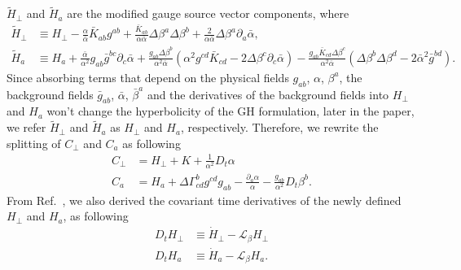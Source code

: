 \documentclass[letterpaper,nofootinbib,prd,amsmath,onecolumn]{revtex4-1}
\begin{document}
${\tilde H}_{\perp}$ and ${\tilde H}_{a}$ are the modified gauge source vector components, where
\begin{subequations}
\begin{align}
{\tilde H}_{\perp} & \equiv H_{\perp} - \frac{\alpha}{{\bar \alpha}}{\bar K}_{ab}g^{ab} + \frac{{\bar K}_{ab}}{\alpha{\bar \alpha}}\Delta \beta^{a} \Delta \beta^{b} + \frac{2}{\alpha {\bar \alpha}}\Delta \beta^{a} \partial_{a}{\bar \alpha}, \\
{\tilde H}_{a} & \equiv H_{a} + \frac{{\bar \alpha}}{\alpha^2}g_{ab}{\bar g}^{bc}\partial_{c}{\bar \alpha} + \frac{g_{ab}\Delta \beta^{b}}{\alpha^2 {\bar \alpha}}(\alpha^2g^{cd}{\bar K}_{cd} - 2\Delta\beta^{c}\partial_{c}{\bar \alpha}) - \frac{g_{ab}{\bar K}_{cd}\Delta \beta^{c}}{\alpha^2{\bar \alpha}}(\Delta \beta^{b}\Delta \beta^{d} - 2{\bar \alpha}^2{\bar g}^{bd}).
\end{align}
\end{subequations}
Since absorbing terms that depend on the physical fields $g_{ab}$, $\alpha$, $\beta^{a}$, the background fields ${\bar g}_{ab}$, ${\bar \alpha}$, ${\bar \beta}^{a}$ and the derivatives of the background fields into $H_{\perp}$ and $H_{a}$ won't change the hyperbolicity of the GH formulation, later in the paper, we refer ${\tilde H}_{\perp}$ and ${\tilde H}_{a}$ as $H_{\perp}$ and $H_{a}$, respectively. Therefore, we rewrite the splitting of $C_{\perp}$ and $C_{a}$ as following
\begin{subequations}
\begin{align}
C_{\perp} & = H_{\perp} + K + \frac{1}{\alpha^{2}}D_{t}\alpha\\
C_{a} & = H_{a} + \Delta \Gamma^{b}_{cd}g^{cd}g_{ab} - \frac{\partial_{a}\alpha}{\alpha} - \frac{g_{ab}}{\alpha^2}D_{t}\beta^{b}.
\end{align}
\end{subequations}
From Ref.~\cite{Meng}, we also derived the covariant time derivatives of the newly defined $H_{\perp}$ and $H_{a}$, as following
\begin{subequations}
\begin{align}
D_{t}H_{\perp} & \equiv {\dot H}_{\perp} - \mathcal{L}_{\beta}H_{\perp}\\
D_{t}H_{a} & \equiv {\dot H}_{a} - \mathcal{L}_{\beta}H_{a}.
\end{align}
\end{subequations}
\end{document}
